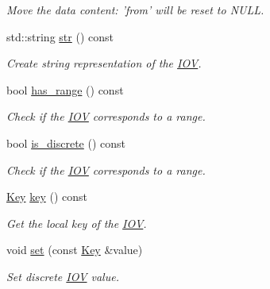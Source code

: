 \begin{DoxyCompactItemize}
\begin{DoxyCompactList}\small\item\em Move the data content: 'from' will be reset to NULL. \item\end{DoxyCompactList}\item 
std::string \hyperlink{class_d_d4hep_1_1_i_o_v_a52ef776877661a865c23e07d2e2c9bef}{str} () const 
\begin{DoxyCompactList}\small\item\em Create string representation of the \hyperlink{class_d_d4hep_1_1_i_o_v}{IOV}. \item\end{DoxyCompactList}\item 
bool \hyperlink{class_d_d4hep_1_1_i_o_v_a9c942c869bb92e7b14b6d6308a6f15d7}{has\_\-range} () const 
\begin{DoxyCompactList}\small\item\em Check if the \hyperlink{class_d_d4hep_1_1_i_o_v}{IOV} corresponds to a range. \item\end{DoxyCompactList}\item 
bool \hyperlink{class_d_d4hep_1_1_i_o_v_a37f1849ee9dfed07510a1628bb4b5796}{is\_\-discrete} () const 
\begin{DoxyCompactList}\small\item\em Check if the \hyperlink{class_d_d4hep_1_1_i_o_v}{IOV} corresponds to a range. \item\end{DoxyCompactList}\item 
\hyperlink{class_d_d4hep_1_1_i_o_v_a07cb46dc875296dc9cccf4ff370104ae}{Key} \hyperlink{class_d_d4hep_1_1_i_o_v_adf743118faa708c28f3299867f946567}{key} () const 
\begin{DoxyCompactList}\small\item\em Get the local key of the \hyperlink{class_d_d4hep_1_1_i_o_v}{IOV}. \item\end{DoxyCompactList}\item 
void \hyperlink{class_d_d4hep_1_1_i_o_v_aa75452d30ebad70f84372091d6f777e4}{set} (const \hyperlink{class_d_d4hep_1_1_i_o_v_a07cb46dc875296dc9cccf4ff370104ae}{Key} \&value)
\begin{DoxyCompactList}\small\item\em Set discrete \hyperlink{class_d_d4hep_1_1_i_o_v}{IOV} value. \item\end{DoxyCompactList}\item 

\end{DoxyCompactItemize}
